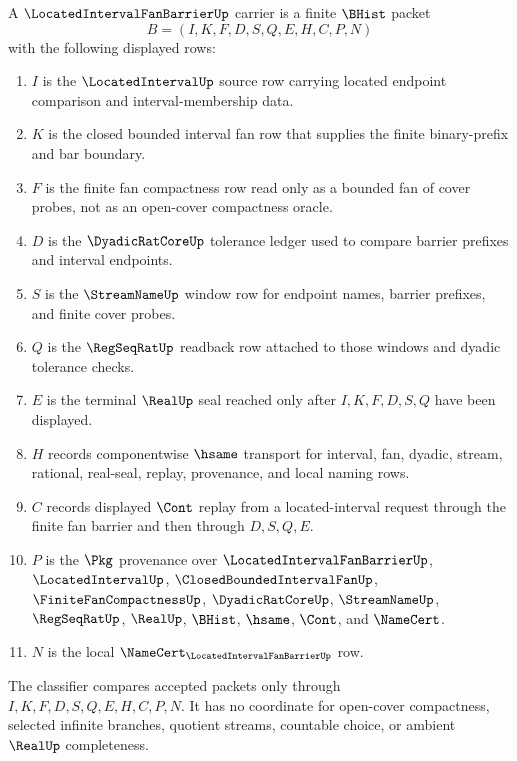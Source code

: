 \begin{definition}
\label{def:located-interval-fan-barrier-carrier}
A $\LocatedIntervalFanBarrierUp$ carrier is a finite $\BHist$ packet
$$
B=(I,K,F,D,S,Q,E,H,C,P,N)
$$
with the following displayed rows:
\begin{enumerate}
\item $I$ is the $\LocatedIntervalUp$ source row carrying located endpoint comparison and interval-membership data.
\item $K$ is the closed bounded interval fan row that supplies the finite binary-prefix and bar boundary.
\item $F$ is the finite fan compactness row read only as a bounded fan of cover probes, not as an open-cover compactness oracle.
\item $D$ is the $\DyadicRatCoreUp$ tolerance ledger used to compare barrier prefixes and interval endpoints.
\item $S$ is the $\StreamNameUp$ window row for endpoint names, barrier prefixes, and finite cover probes.
\item $Q$ is the $\RegSeqRatUp$ readback row attached to those windows and dyadic tolerance checks.
\item $E$ is the terminal $\RealUp$ seal reached only after $I,K,F,D,S,Q$ have been displayed.
\item $H$ records componentwise $\hsame$ transport for interval, fan, dyadic, stream, rational, real-seal, replay, provenance, and local naming rows.
\item $C$ records displayed $\Cont$ replay from a located-interval request through the finite fan barrier and then through $D,S,Q,E$.
\item $P$ is the $\Pkg$ provenance over $\LocatedIntervalFanBarrierUp$, $\LocatedIntervalUp$, $\ClosedBoundedIntervalFanUp$, $\FiniteFanCompactnessUp$, $\DyadicRatCoreUp$, $\StreamNameUp$, $\RegSeqRatUp$, $\RealUp$, $\BHist$, $\hsame$, $\Cont$, and $\NameCert$.
\item $N$ is the local $\NameCert_{\LocatedIntervalFanBarrierUp}$ row.
\end{enumerate}
The classifier compares accepted packets only through $I,K,F,D,S,Q,E,H,C,P,N$. It has no coordinate for open-cover compactness, selected infinite branches, quotient streams, countable choice, or ambient $\RealUp$ completeness.
\end{definition}

